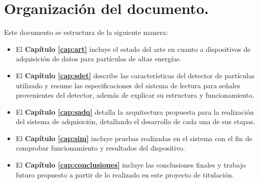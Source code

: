 \section{Organización del documento.}

	Este documento se estructura de la siguiente manera:
	
	\begin{itemize}
		\item El \textbf{Capítulo \ref{cap:art}} incluye el estado del arte en cuanto a dispositivos de adquisición de datos para partículas de altas energías.
		\item El \textbf{Capítulo \ref{cap:sdet}} describe las características del detector de partículas utilizado y resume las especificaciones del sistema de lectura para señales provenientes del detector, además de explicar su estructura y funcionamiento.
		\item El \textbf{Capítulo \ref{cap:sadq}} detalla la arquitectura propuesta para la realización del sistema de adquisición, detallando el desarrollo de cada una de sus etapas.
		\item El \textbf{Capítulo \ref{cap:sim}} incluye pruebas realizadas en el sistema con el fin de comprobar funcionamiento y resultados del dispositivo.
		\item El \textbf{Capítulo \ref{cap:conclusiones}} incluye las conclusiones finales y trabajo futuro propuesto a partir de lo realizado en este proyecto de titulación.
	\end{itemize}

